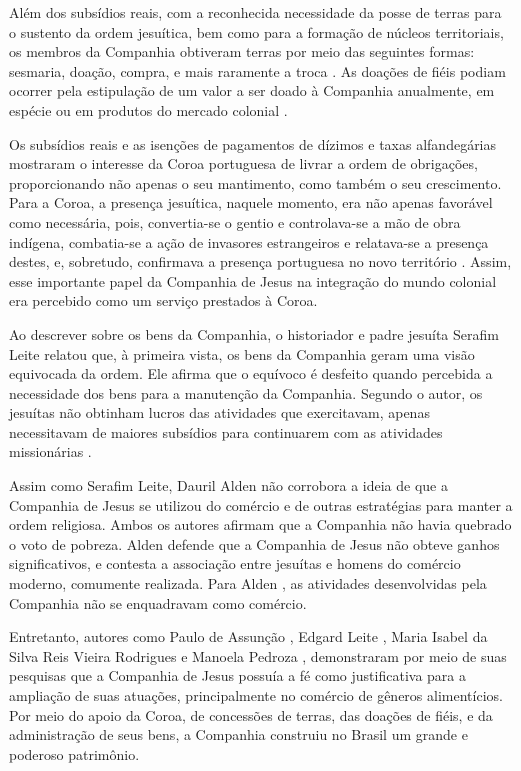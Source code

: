 \begin{refsection}
Além dos subsídios reais, com a reconhecida necessidade da posse de terras para o sustento da ordem jesuítica, bem como para a formação de núcleos territoriais, os membros da Companhia obtiveram terras por meio das seguintes formas: sesmaria, doação, compra, e mais raramente a troca \cite[p.~12]{Alveal2002}. As doações de fiéis podiam ocorrer pela estipulação de um valor a ser doado à Companhia anualmente, em espécie ou em produtos do mercado colonial \cite[p.~81]{Assuncao2004}. 

Os subsídios reais e as isenções de pagamentos de dízimos e taxas alfandegárias mostraram o interesse da Coroa portuguesa de livrar a ordem de obrigações, proporcionando não apenas o seu mantimento, como também o seu crescimento. Para a Coroa, a presença jesuítica, naquele momento, era não apenas favorável como necessária, pois, convertia-se o gentio e controlava-se a mão de obra indígena, combatia-se a ação de invasores estrangeiros e relatava-se a presença destes, e, sobretudo, confirmava a presença portuguesa no novo território \cite[p.~156]{Assuncao2004}. Assim, esse importante papel da Companhia de Jesus na integração do mundo colonial era percebido como um serviço prestados à Coroa. 

Ao descrever sobre os bens da Companhia, o historiador e padre jesuíta Serafim Leite relatou que, à primeira vista, os bens da Companhia geram uma visão equivocada da ordem. Ele afirma que o equívoco é desfeito quando percebida a necessidade dos bens para a manutenção da Companhia. Segundo o autor, os jesuítas não obtinham lucros das atividades que exercitavam, apenas necessitavam de maiores subsídios para continuarem com as atividades missionárias \cite[Tombo~I,~p.~49]{Leite2004}.

Assim como Serafim Leite, Dauril Alden não corrobora a ideia de que a Companhia de Jesus se utilizou do comércio e de outras estratégias para manter a ordem religiosa. Ambos os autores afirmam que a Companhia não havia quebrado o voto de pobreza. Alden defende que a Companhia de Jesus não obteve ganhos significativos, e contesta a associação entre jesuítas e homens do comércio moderno, comumente realizada. Para Alden \citeyear[p.~527]{Alden1996}, as atividades desenvolvidas pela Companhia não se enquadravam como comércio.  

Entretanto, autores como Paulo de Assunção \citeyear{Assuncao2004}, Edgard Leite \citeyear{Leite2000}, Maria Isabel da Silva Reis Vieira Rodrigues \citeyear{Rodrigues1997} e Manoela Pedroza \citeyear{Pedroza2020}, demonstraram por meio de suas pesquisas que a Companhia de Jesus possuía a fé como justificativa para a ampliação de suas atuações, principalmente no comércio de gêneros alimentícios. Por meio do apoio da Coroa, de concessões de terras, das doações de fiéis, e da administração de seus bens, a Companhia construiu no Brasil um grande e poderoso patrimônio.   


\end{refsection}
